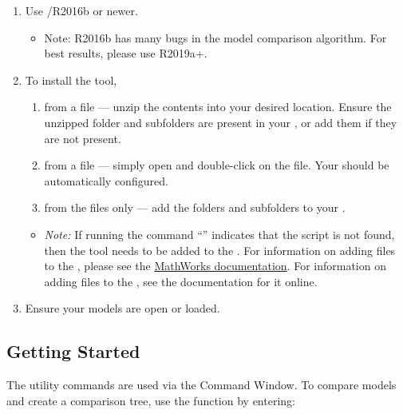\documentclass{article}
\begin{document}
\begin{enumerate}
  \item Use \Matlab/\Simulink R2016b or newer.
		\begin{itemize}
			\item Note: R2016b has many bugs in the model comparison algorithm. For best results, please use R2019a+.
		\end{itemize}
	\item To install the tool,
	\begin{enumerate}
		\item from a  file --- unzip the contents into your desired location. Ensure the unzipped folder and subfolders are present in your \mpath, or add them if they are not present. %
		\item from a  file --- simply open \Matlab and double-click on the file. Your \mpath should be automatically configured.
		\item from the files only --- add the folders and subfolders to your \mpath. %
	\end{enumerate}
	\begin{itemize}
		\item \textit{Note:} If running the command ``'' indicates that the script is not found, then the tool needs to be added to the \mpath.
		For information on adding files to the \mpath, please see the \href{https://www.mathworks.com/help/matlab/matlab_env/add-remove-or-reorder-folders-on-the-search-path.html}{MathWorks documentation}.
		For information on adding files to the \mpath, see the documentation for it online.
	\end{itemize}
	\item Ensure your models are open or loaded.
\end{enumerate}

\subsection{Getting Started}

The utility commands are used via the \Matlab Command Window. To compare models and create a comparison tree, use the  function by entering:
\end{document}

